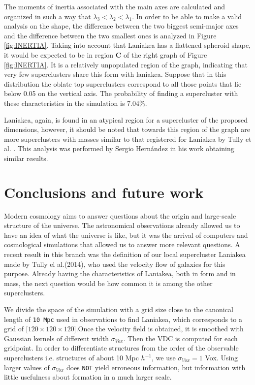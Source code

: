 The moments of inertia associated with the main axes are calculated and organized in such a way that $ \lambda_3 < \lambda_2 < \lambda_1 $. In order to be able to make a valid analysis on the shape, the difference between the two biggest semi-major axes and the difference between the two smallest ones is analyzed in Figure \ref{fig:INERTIA}. Taking into account that Laniakea has a flattened spheroid shape, it would be expected to be in region \textbf{C} of the right graph of Figure \ref{fig:INERTIA}. It is a relatively unpopulated region of the graph, indicating that very few superclusters share this form with laniakea. Suppose that in this distribution the oblate top superclusters correspond to all those points that lie below 0.05 on the vertical axis. The probability of finding a supercluster with these characteristics in the simulation is 7.04\%.

Laniakea, again, is found in an atypical region for a supercluster of the proposed dimensions, however, it should be noted that towards this region of the graph are more superclusters with masses similar to that registered for Laniakea by Tully et  al. \cite{tully_laniakea_2014}. This analysis was performed by Sergio Hernández in his work\cite{SHC_TESIS} obtaining similar results.




\newpage
\section{Conclusions and future work}
Modern cosmology aims to answer questions about the origin and large-scale structure of the universe. The astronomical observations already allowed us to have an idea of what the universe is like, but it was the arrival of computers and cosmological simulations that allowed us to answer more relevant questions.
A recent result in this branch was the definition of our local supercluster Laniakea made by Tully el al.(2014)\cite{tully_laniakea_2014}, who used the velocity flow of galaxies for this purpose. Already having the characteristics of Laniakea, both in form and in mass, the next question would be how common it is among the other superclusters.

We divide the space of the simulation with a grid size close to the canonical length of \texttt{10 Mpc} used in observations to find Laniakea, which corresponds to a grid of [$120 \times 120 \times 120$].Once the velocity field is obtained, it is smoothed with Gaussian kernels of different width $\sigma_{Vox}$. Then the VDC is computed for each gridpoint. In order to differentiate structures from the order of the observable superclusters i.e. structures of about 10 Mpc $h^{-1}$, we use $\sigma_{Vox} = 1$ Vox. Using larger values of $\sigma_{Vox}$ does \texttt{NOT} yield erroneous information, but information with little usefulness about formation in a much larger scale.  

